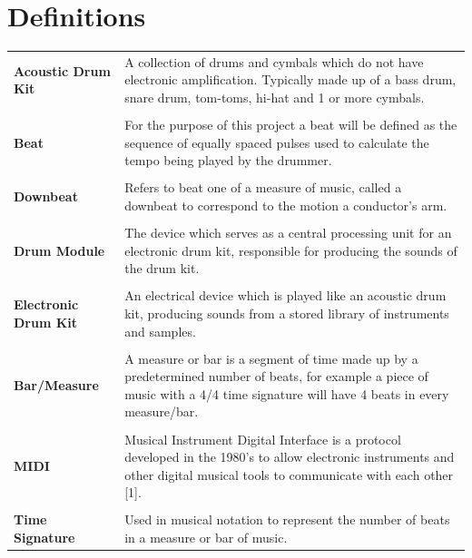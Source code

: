 \documentclass[a4paper, 11pt]{article}
\begin{document}
\section*{Definitions}
\begin{tabular}{l p{4.5in}  }\\
\textbf{Acoustic Drum Kit} & A collection of drums and cymbals which do not have electronic amplification. Typically made up of a bass drum, snare drum, tom-toms, hi-hat and 1 or more cymbals.\\\\
\textbf{Beat} & For the purpose of this project a beat will be defined as the sequence of equally spaced pulses used to calculate the tempo being played by the drummer.\\\\
\textbf{Downbeat} & Refers to beat one of a measure of music, called a downbeat to correspond to the motion a conductor's arm.\\\\
\textbf{Drum Module} & The device which serves as a central processing unit for an electronic drum kit, responsible for producing the sounds of the drum kit.\\\\
\textbf{Electronic Drum Kit} & An electrical device which is played like an acoustic drum kit, producing sounds from a stored library of instruments and samples.\\\\
\textbf{Bar/Measure} & A measure or bar is a segment of time made up by a predetermined number of beats, for example a piece of music with a 4/4 time signature will have 4 beats in every measure/bar.\\\\
\textbf{MIDI} & Musical Instrument Digital Interface is a protocol developed in the 1980's to allow electronic instruments and other digital musical tools to communicate with each other [1].\\\\
\textbf{Time Signature} & Used in musical notation to represent the number of beats in a measure or bar of music.
\end{tabular}
\clearpage
\end{document}
